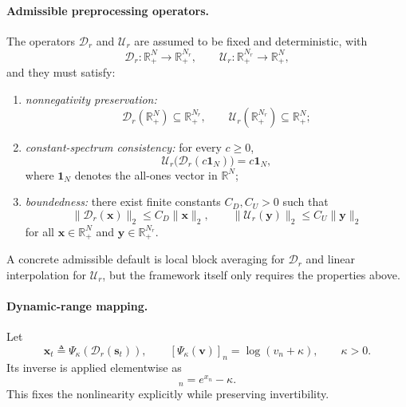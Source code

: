\documentclass[11pt]{article}
\begin{document}
\paragraph{Admissible preprocessing operators.}
The operators $\mathcal{D}_{r}$ and $\mathcal{U}_{r}$ are assumed to be fixed and deterministic,
with
\begin{equation}
\mathcal{D}_{r} : \mathbb{R}_{+}^{N} \to \mathbb{R}_{+}^{N_r},
\qquad
\mathcal{U}_{r} : \mathbb{R}_{+}^{N_r} \to \mathbb{R}_{+}^{N},
\end{equation}
and they must satisfy:
\begin{enumerate}
    \item \emph{nonnegativity preservation:}
    \begin{equation}
    \mathcal{D}_{r}(\mathbb{R}_{+}^{N}) \subseteq \mathbb{R}_{+}^{N_r},
    \qquad
    \mathcal{U}_{r}(\mathbb{R}_{+}^{N_r}) \subseteq \mathbb{R}_{+}^{N};
    \end{equation}

    \item \emph{constant-spectrum consistency:} for every $c \ge 0$,
    \begin{equation}
    \mathcal{U}_{r}\!\big(\mathcal{D}_{r}(c\mathbf{1}_{N})\big)
    =
    c\mathbf{1}_{N},
    \end{equation}
    where $\mathbf{1}_{N}$ denotes the all-ones vector in $\mathbb{R}^{N}$;

    \item \emph{boundedness:} there exist finite constants $C_D, C_U > 0$ such that
    \begin{equation}
    \|\mathcal{D}_{r}(\mathbf{x})\|_2 \le C_D\|\mathbf{x}\|_2,
    \qquad
    \|\mathcal{U}_{r}(\mathbf{y})\|_2 \le C_U\|\mathbf{y}\|_2
    \end{equation}
    for all $\mathbf{x} \in \mathbb{R}_{+}^{N}$ and $\mathbf{y} \in \mathbb{R}_{+}^{N_r}$.
\end{enumerate}
A concrete admissible default is local block averaging for $\mathcal{D}_{r}$ and linear
interpolation for $\mathcal{U}_{r}$, but the framework itself only requires the properties above.

\paragraph{Dynamic-range mapping.}
Let
\begin{equation}
\mathbf{x}_t
\triangleq
\Psi_{\kappa}\!\left(\mathcal{D}_{r}(\mathbf{s}_t)\right),
\qquad
[\Psi_{\kappa}(\mathbf{v})]_n = \log(v_n + \kappa),
\qquad
\kappa > 0.
\end{equation}
Its inverse is applied elementwise as
\begin{equation}
[\Psi_{\kappa}^{-1}(\mathbf{x})]_n = e^{x_n} - \kappa.
\end{equation}
This fixes the nonlinearity explicitly while preserving invertibility.
\end{document}
